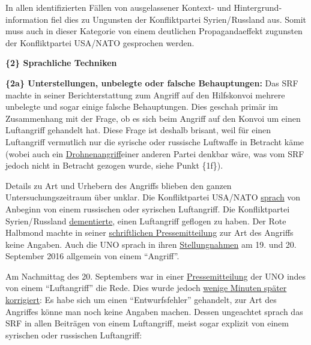 In allen identifizierten Fällen von ausgelassener Kontext- und
Hintergrund­information fiel dies zu Ungunsten der Konfliktpartei
Syrien/ Russland aus. Somit muss auch in dieser Kategorie von einem
deutlichen Propagandaeffekt zugunsten der Konfliktpartei USA/NATO
gesprochen werden.

\textbf{\{2\} Sprachliche Techniken}

\textbf{\{2a\} Unterstellungen, unbelegte oder falsche Behauptungen:}
Das SRF machte in seiner Bericht­erstattung zum Angriff auf den
Hilfskonvoi mehrere unbelegte und sogar einige falsche Be­haup­tungen.
Dies geschah primär im Zusammenhang mit der Frage, ob es sich beim
Angriff auf den Konvoi um einen Luftangriff gehandelt hat. Diese Frage
ist deshalb brisant, weil für einen Luftangriff ver­mut­lich nur die
syrische oder russische Luftwaffe in Betracht käme (wobei auch ein
\href{http://www.wsj.com/articles/russia-suggests-u-s-drone-may-have-hit-aid-convoy-in-syria-1474483634}{Drohnen­angriff}einer
anderen Partei denkbar wäre, was vom SRF jedoch nicht in Betracht
gezogen wurde, siehe Punkt \{1f\}).

Details zu Art und Urhebern des Angriffs blieben den ganzen
Untersuchungszeitraum über unklar. Die Konfliktpartei USA/NATO
\href{http://www.nytimes.com/2016/09/21/world/middleeast/syria-cease-fire.html}{sprach}
von Anbeginn von einem russischen oder syrischen Luftangriff. Die
Konfliktpartei Syrien/ Russland
\href{http://www.wsj.com/articles/death-toll-rises-in-syria-aid-convoy-attack-1474370636}{dementierte},
einen Luftangriff geflogen zu haben. Der Rote Halbmond machte in seiner
\href{http://sarc.sy/syria-attack-humanitarian-convoy-attack-humanity/}{schriftlichen
Pressemitteilung} zur Art des Angriffs keine Angaben. Auch die UNO
sprach in ihren
\href{http://www.unocha.org/top-stories/all-stories/syria-unsarc-convoy-hit-urum-al-kubra-northwest-aleppo-city}{Stellungnahmen}
am 19. und 20. September 2016 allgemein von einem ``Angriff''.

Am Nachmittag des 20. Septembers war in einer
\href{http://reliefweb.int/report/syrian-arab-republic/statement-attributable-massimo-diana-un-resident-and-humanitarian}{Pressemitteilung}
der UNO indes von einem ``Luftangriff'' die Rede. Dies wurde jedoch
\href{http://www.reuters.com/article/us-mideast-crisis-syria-communications-idUSKCN11Q20M}{wenige
Minuten später korrigiert}: Es habe sich um einen ``Entwurfsfehler''
gehandelt, zur Art des Angriffes könne man noch keine Angaben machen.
Dessen ungeachtet sprach das SRF in allen Beiträgen von einem
Luftangriff, meist sogar explizit von einem syrischen oder russischen
Luftangriff:

